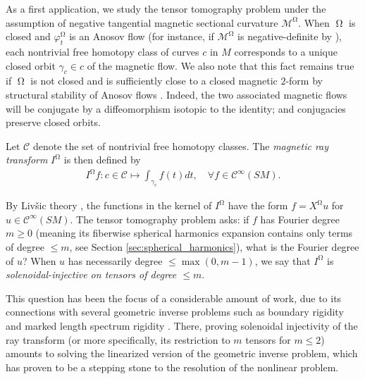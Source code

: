 \documentclass[12pt]{amsart}
\numberwithin{numbering}{section}
\theoremstyle{plain}
\theoremstyle{definition}
\theoremstyle{remark}
\numberwithin{equation}{section}
\DeclareMathOperator{\mg}{\Omega}
\begin{document}
As a first application, we study the tensor tomography problem under the assumption of negative tangential magnetic sectional curvature $\mathcal{M}^{\mg}$. When $\mg$ is closed and $\varphi_t^{\mg}$ is an Anosov flow (for instance, if $\mathcal{M}^{\mg}$ is negative-definite by \cite[Appendix A]{assenza2025hopf}), each nontrivial free homotopy class of curves $c$ in $M$ corresponds to a unique closed orbit $\gamma_c \in c$ of the magnetic flow. We also note that this fact remains true if $\mg$ is not closed and is sufficiently close to a closed magnetic $2$-form by structural stability of Anosov flows \cite{delallave1986perturbation}. Indeed, the two associated magnetic flows will be conjugate by a diffeomorphism isotopic to the identity; and conjugacies preserve closed orbits.

Let $\mathcal{C}$ denote the set of nontrivial free homotopy classes. The \emph{magnetic ray transform} $I^{\mg}$ is then defined by 
\begin{align*}
I^{\mg} f : c \in \mathcal{C} \mapsto \int_{\gamma_c} f(t) dt, \quad \forall f \in \mathcal{C}^\infty(SM).
\end{align*}

By Liv\v{s}ic theory \cite[Theorem 11.1.2]{lefeuvre2024microlocal}, the functions in the kernel of $I^{\mg}$ have the form $f = X^{\mg} u$ for $u \in \mathcal{C}^\infty(SM)$. The tensor tomography problem asks: if $f$ has Fourier degree $m \geq 0$ (meaning its fiberwise spherical harmonics expansion contains only terms of degree $\leq m$, see Section \ref{sec:spherical_harmonics}), what is the Fourier degree of $u$? When $u$ has necessarily degree $\leq \max(0, m - 1)$, we say that $I^{\mg}$ is \emph{solenoidal-injective on tensors of degree $\leq m$}.

\smallskip

This question has been the focus of a considerable amount of work, due to its connections with several geometric inverse problems such as boundary rigidity \cite{dairbekov2003integral, pestov2005rigid,paternain2013tomography,uhlmann2016inverse,guillarmou2017lens,guillarmou2017invariant,uhlmann2021rigidity} and marked length spectrum rigidity \cite{guillarmou2019length, guillarmou2025marked}. There, proving solenoidal injectivity of the ray transform (or more specifically, its restriction to $m$ tensors for $m \leq 2$) amounts to solving the linearized version of the geometric inverse problem, which has proven to be a stepping stone to the resolution of the nonlinear problem.

\smallskip
\end{document}
